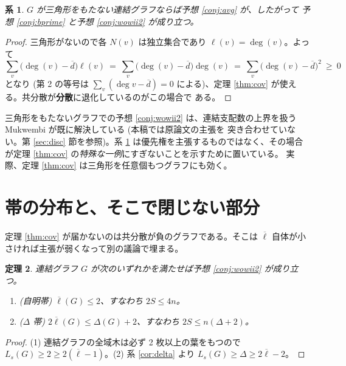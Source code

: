 \documentclass[paper=a4,fontsize=10.5pt,jafontsize=10.5pt]{jlreq}
\theoremstyle{plain}
\newtheorem{theorem}{定理}[section]
\newtheorem{corollary}[theorem]{系}
\theoremstyle{definition}
\begin{document}
\begin{corollary}\label{cor:trianglefree}
$G$ が三角形をもたない連結グラフならば予想 \ref{conj:avg} が、したがって
予想 \ref{conj:bprime} と予想 \ref{conj:wowii2} が成り立つ。
\end{corollary}

\begin{proof}
三角形がないので各 $N(v)$ は独立集合であり $\ell(v) = \deg(v)$。よって
\[ \sum_v \bigl(\deg(v) - \overline{d}\bigr)\ell(v)
   \ = \ \sum_v \bigl(\deg(v) - \overline{d}\bigr)\deg(v)
   \ = \ \sum_v \bigl(\deg(v) - \overline{d}\bigr)^2
   \ \ge \ 0 \]
となり (第 2 の等号は $\sum_v (\deg v - \overline{d}) = 0$ による)、定理
\ref{thm:cov} が使える。共分散が\textbf{分散}に退化しているのがこの場合で
ある。
\end{proof}

三角形をもたないグラフでの予想 \ref{conj:wowii2} は、連結支配数の上界を扱う
Mukwembi \cite{mukwembi} が既に解決している (本稿では原論文の主張を
突き合わせていない。第 \ref{sec:disc} 節を参照)。系
\ref{cor:trianglefree} は優先権を主張するものではなく、その場合が定理
\ref{thm:cov} の\emph{特殊な一例}にすぎないことを示すために置いている。
実際、定理 \ref{thm:cov} は三角形を任意個もつグラフにも効く。

\section{帯の分布と、そこで閉じない部分}\label{sec:zones}

定理 \ref{thm:cov} が届かないのは共分散が負のグラフである。そこは
$\overline{\ell}$ 自体が小さければ主張が弱くなって別の議論で埋まる。

\begin{theorem}\label{thm:zones}
連結グラフ $G$ が次のいずれかを満たせば予想 \ref{conj:wowii2} が成り立つ。
\begin{enumerate}
\item (自明帯) $\overline{\ell}(G) \le 2$、すなわち $2S \le 4n$。
\item ($\Delta$ 帯) $2\overline{\ell}(G) \le \Delta(G) + 2$、すなわち
  $2S \le n(\Delta + 2)$。
\end{enumerate}
\end{theorem}

\begin{proof}
(1) 連結グラフの全域木は必ず 2 枚以上の葉をもつので $L_s(G) \ge 2 \ge
2(\overline{\ell} - 1)$。(2) 系 \ref{cor:delta} より
$L_s(G) \ge \Delta \ge 2\overline{\ell} - 2$。
\end{proof}
\end{document}
